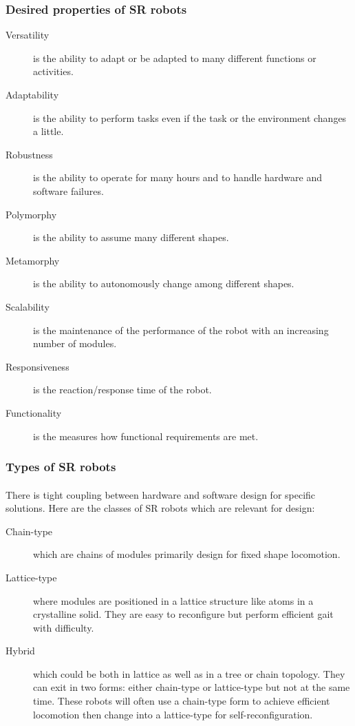 \subsubsection{Desired properties of SR robots}
\begin{description}
	\item[Versatility]{is the ability to adapt or be adapted to many different functions or activities.}
	\item[Adaptability]{is the ability to perform tasks even if the task or the environment changes a little.}
	\item[Robustness]{is the  ability to operate for many hours and to handle hardware and software failures.}
	\item[Polymorphy]{is the ability to assume many different shapes.}
	\item[Metamorphy]{is the ability to autonomously change among different shapes.}
	\item[Scalability]{is the maintenance of the performance of the robot with an increasing number of modules.}
	\item[Responsiveness]{is the reaction/response time of the robot.}
	\item[Functionality]{is the measures how functional requirements are met.}
\end{description}
\subsubsection{Types of SR robots}
\paragraph{}There is tight coupling between hardware and software design for specific solutions. Here are the classes of SR robots which are relevant for design:
\begin{description}
	\item[Chain-type]{which are chains of modules primarily design for fixed shape locomotion.}
	\item[Lattice-type]{where modules are positioned in a lattice structure like atoms in a crystalline solid. They are easy to reconfigure but perform efficient gait with difficulty.}
	\item[Hybrid]{which could be both in lattice as well as in a tree or chain topology. They can exit in two forms: either  chain-type or  lattice-type but not at the same time. These robots will often use a chain-type form to achieve efficient locomotion then change into a lattice-type for self-reconfiguration.}
\end{description}
